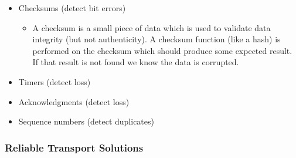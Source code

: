 \begin{itemize}
  \begin{itemize}
  \tightlist
  \item
    Checksums (detect bit errors)

    \begin{itemize}
    \tightlist
    \item
      A checksum is a small piece of data which is used to validate data
      integrity (but not authenticity). A checksum function (like a
      hash) is performed on the checksum which should produce some
      expected result. If that result is not found we know the data is
      corrupted.
    \end{itemize}
  \item
    Timers (detect loss)
  \item
    Acknowledgments (detect loss)
  \item
    Sequence numbers (detect duplicates)
  \end{itemize}
\end{itemize}

\hypertarget{reliable-transport-solutions}{%
\subsubsection{Reliable Transport
Solutions}\label{reliable-transport-solutions}}

